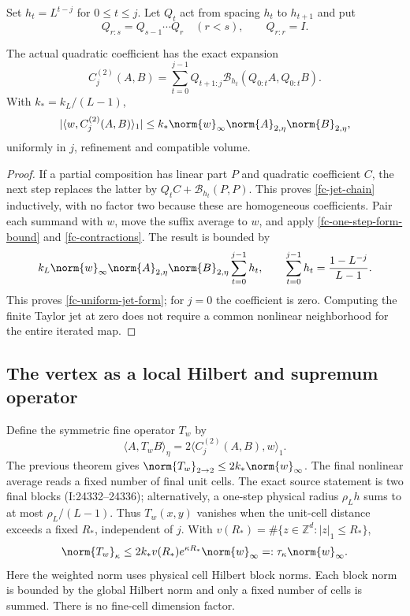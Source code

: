 Set $h_t=L^{t-j}$ for $0\le t\le j$. Let $Q_t$ act from spacing
$h_t$ to $h_{t+1}$ and put
\[
 Q_{r:s}=Q_{s-1}\cdots Q_r\quad(r<s),\qquad Q_{r:r}=I.
\]

\begin{theorem}
\label{fc-iterated-jet-theorem}
The actual quadratic coefficient has the exact expansion
\begin{equation}
 C_j^{(2)}(A,B)=\sum_{t=0}^{j-1}Q_{t+1:j}
       \mathcal B_{h_t}(Q_{0:t}A,Q_{0:t}B).
 \label{fc-jet-chain}
\end{equation}
With $k_*=k_L/(L-1)$,
\begin{equation}
 |\langle w,C_j^{(2)}(A,B)\rangle_1|
 \le k_*\norm{w}_\infty\norm{A}_{2,\eta}\norm{B}_{2,\eta},
 \label{fc-uniform-jet-form}
\end{equation}
uniformly in $j$, refinement and compatible volume.
\end{theorem}

\begin{proof}
If a partial composition has linear part $P$ and quadratic
coefficient $C$, the next step replaces the latter by
$Q_tC+\mathcal B_{h_t}(P,P)$. This proves
\eqref{fc-jet-chain} inductively, with no factor two because these
are homogeneous coefficients. Pair each summand with $w$, move
the suffix average to $w$, and apply
\eqref{fc-one-step-form-bound} and \eqref{fc-contractions}.
The result is bounded by
\[
 k_L\norm{w}_\infty\norm{A}_{2,\eta}\norm{B}_{2,\eta}
       \sum_{t=0}^{j-1}h_t,
 \qquad
 \sum_{t=0}^{j-1}h_t=\frac{1-L^{-j}}{L-1}.
\]
This proves \eqref{fc-uniform-jet-form}; for $j=0$ the coefficient
is zero. Computing the finite Taylor jet at zero does not require
a common nonlinear neighborhood for the entire iterated map.
\end{proof}

\subsection{The vertex as a local Hilbert and supremum operator}
\label{fc-vertex-norm-section}

Define the symmetric fine operator $T_w$ by
\begin{equation}
 \langle A,T_wB\rangle_\eta
       =2\langle C_j^{(2)}(A,B),w\rangle_1.
 \label{fc-T-definition}
\end{equation}
The previous theorem gives
$\norm{T_w}_{2\to2}\le2k_*\norm{w}_\infty$.
The final nonlinear average reads a fixed number of final unit
cells. The exact source statement is two final blocks
(I:24332--24336); alternatively, a one-step physical radius
$\rho_Lh$ sums to at most $\rho_L/(L-1)$. Thus $T_w(x,y)$ vanishes
when the unit-cell distance exceeds a fixed $R_*$, independent of
$j$. With $v(R_*)=\#\{z\in\mathbb Z^d:|z|_1\le R_*\}$,
\begin{equation}
 \norm{T_w}_\kappa\le
  2k_*v(R_*)e^{\kappa R_*}\norm{w}_\infty
  =:\tau_\kappa\norm{w}_\infty.
 \label{fc-T-weighted}
\end{equation}
Here the weighted norm uses physical cell Hilbert block norms.
Each block norm is bounded by the global Hilbert norm and only a
fixed number of cells is summed. There is no fine-cell dimension
factor.

